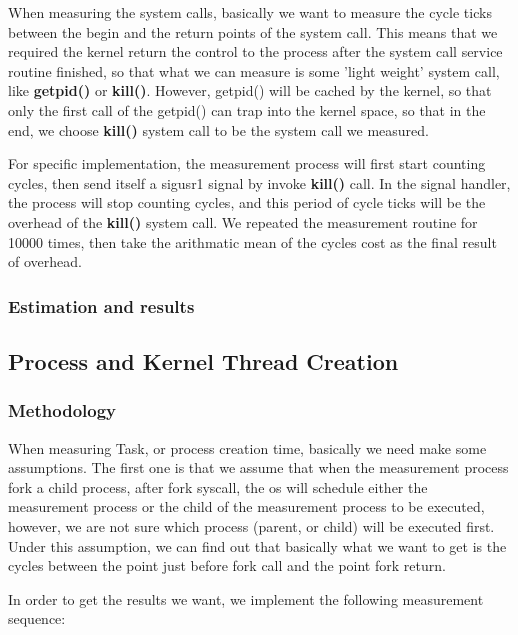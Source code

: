 When measuring the system calls, basically we want to measure the cycle ticks between the begin and the return points of the system call. This means that we required the kernel return the control to the process after the system call
service routine finished, so that what we can measure is some 'light weight' system call, like \textbf{getpid()} or \textbf{kill()}. However, getpid() will be cached by the kernel, so that only the first call of the getpid() can trap into
the kernel space, so that in the end, we choose \textbf{kill()} system call to be the system call we measured.

For specific implementation, the measurement process will first start counting cycles, then send itself a sigusr1 signal by invoke \textbf{kill()} call. In the signal handler, the process will stop counting cycles, and this period of cycle ticks
will be the overhead of the \textbf{kill()} system call. We repeated the measurement routine for 10000 times, then take the arithmatic mean of the cycles cost as the final result of overhead.


\subsubsection{Estimation and results}



\subsection{Process and Kernel Thread Creation}

\subsubsection{Methodology}
\label {creation_methodology}

When measuring Task, or process creation time, basically we need make some assumptions. The first one is that we assume that when the measurement process fork a child process, after fork syscall, the os will schedule either
the measurement process or the child of the measurement process to be executed, however, we are not sure which process (parent, or child) will be executed first. Under this assumption, we can find out that basically what
we want to get is the cycles between the point just before fork call and the point fork return.

In order to get the results we want, we implement the following measurement sequence:

